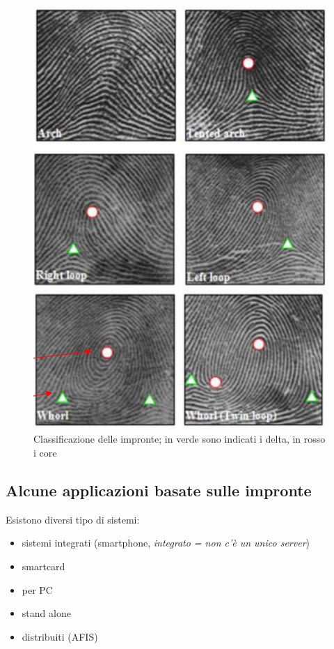\begin{figure}[ht]
    \centering
    \includegraphics[width=0.6\linewidth]{chapters/images-chap5/classificazione.png}
    \caption{Classificazione delle impronte; in verde sono indicati i delta, in rosso i core}
\end{figure}

\subsection{Alcune applicazioni basate sulle impronte}

Esistono diversi tipo di sistemi:
\begin{itemize}
    \item sistemi integrati (smartphone, \textit{integrato = non c'è un unico server})
    \item smartcard
    \item per PC
    \item stand alone
    \item distribuiti (AFIS)
\end{itemize}

